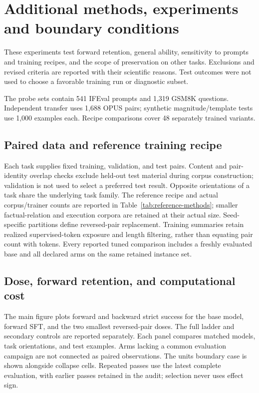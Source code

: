 \section{Additional methods, experiments and boundary conditions}
\label{app:planned-evaluations}
These experiments test forward retention, general ability, sensitivity to prompts and
training recipes, and the scope of preservation on other tasks. Exclusions and revised
criteria are reported with their scientific reasons. Test outcomes were not used to choose
a favorable training run or diagnostic subset.

The probe sets contain 541 IFEval prompts and 1,319 GSM8K questions. Independent transfer
uses 1,688 OPUS pairs; synthetic magnitude/template tests use 1,000 examples each. Recipe
comparisons cover 48 separately trained variants.

\subsection{Paired data and reference training recipe}
\label{app:reference-methods}

Each task supplies fixed training, validation, and test pairs. Content and pair-identity
overlap checks exclude held-out test material during corpus construction; validation is
not used to select a preferred test result. Opposite orientations of a task share the
underlying task family. The reference recipe and actual corpus/trainer counts are reported
in Table~\ref{tab:reference-methods}; smaller factual-relation and execution corpora are
retained at their actual size. Seed-specific partitions define reversed-pair replacement.
Training summaries retain realized supervised-token exposure and length filtering, rather
than equating pair count with tokens. Every reported tuned comparison includes a freshly
evaluated base and all declared arms on the same retained instance set.


\subsection{Dose, forward retention, and computational cost}
\label{app:dose-summary}

The main figure plots forward and backward strict success for the base model, forward SFT,
and the two smallest reversed-pair doses. The full ladder and secondary controls are
reported separately. Each panel compares matched models, task orientations, and test
examples. Arms lacking a common evaluation campaign are not
connected as paired observations. The units boundary case is shown alongside collapse cells.
Repeated passes use the latest complete evaluation, with earlier passes retained in the
audit; selection never uses effect sign.

